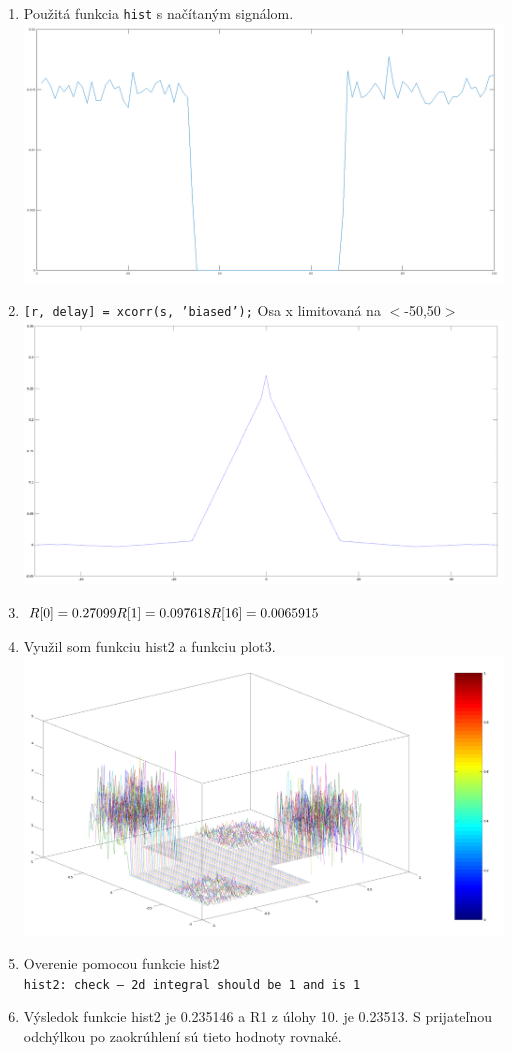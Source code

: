\documentclass[a4paper,12pt,twocolumn]{article}
\begin{document}
\begin{enumerate}
\item
Použitá funkcia \texttt{hist} s načítaným signálom.
\includegraphics[width=\linewidth]{9}
\item
\texttt{[r, delay] = xcorr(s, 'biased');} Osa x limitovaná na $<$-50,50$>$
\includegraphics[width=\linewidth]{10}
\item
$R[0] = 0.27099 \\
R[1] = 0.097618 \\
R[16] = 0.0065915$
\item
Využil som funkciu hist2 a funkciu plot3.
\includegraphics[width=\linewidth]{12}
\item
Overenie pomocou funkcie hist2 \\
\texttt{hist2: check -- 2d integral should be 1 and is 1}
\item
Výsledok funkcie hist2 je 0.235146 a R1 z úlohy 10. je 0.23513. S prijateľnou odchýlkou po zaokrúhlení sú tieto hodnoty rovnaké.
\end{enumerate}
\end{document}
